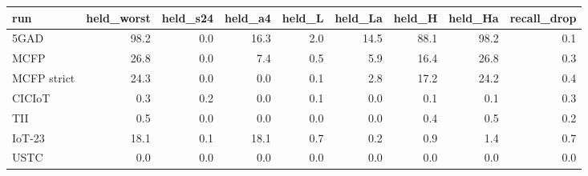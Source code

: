 \begin{tabular}{lrrrrrrrr}
\toprule
run & held\_worst & held\_s24 & held\_a4 & held\_L & held\_La & held\_H & held\_Ha & recall\_drop \\
\midrule
5GAD & 98.2 & 0.0 & 16.3 & 2.0 & 14.5 & 88.1 & 98.2 & 0.1 \\
MCFP & 26.8 & 0.0 & 7.4 & 0.5 & 5.9 & 16.4 & 26.8 & 0.3 \\
MCFP strict & 24.3 & 0.0 & 0.0 & 0.1 & 2.8 & 17.2 & 24.2 & 0.4 \\
CICIoT & 0.3 & 0.2 & 0.0 & 0.1 & 0.0 & 0.1 & 0.1 & 0.3 \\
TII & 0.5 & 0.0 & 0.0 & 0.0 & 0.0 & 0.4 & 0.5 & 0.2 \\
IoT-23 & 18.1 & 0.1 & 18.1 & 0.7 & 0.2 & 0.9 & 1.4 & 0.7 \\
USTC & 0.0 & 0.0 & 0.0 & 0.0 & 0.0 & 0.0 & 0.0 & 0.0 \\
\bottomrule
\end{tabular}
